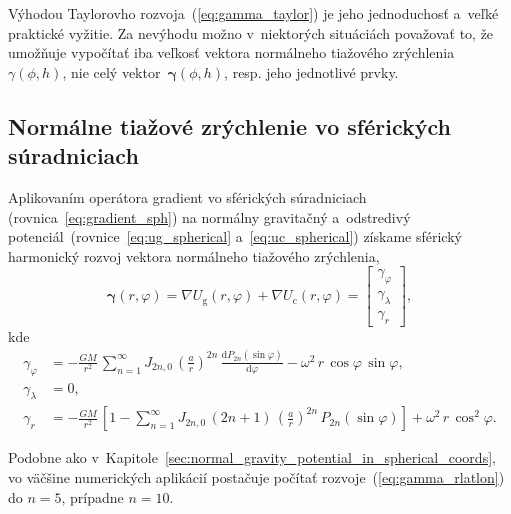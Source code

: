 \documentclass[a4paper,12pt]{book}
\newcommand{\diff}{\mathrm d}
\newcommand{\gidx}{\mathrm g}
\newcommand{\cidx}{\mathrm c}
\begin{document}
Výhodou Taylorovho rozvoja~(\ref{eq:gamma_taylor}) je jeho jednoduchosť a~veľké 
praktické vyžitie.  Za nevýhodu možno v~niektorých situáciách považovať to, že 
umožňuje vypočítať iba veľkosť vektora normálneho tiažového zrýchlenia 
$\gamma(\phi, h)$, nie celý vektor~$\boldsymbol \gamma(\phi, h)$, resp. jeho 
jednotlivé prvky.







\subsection{Normálne tiažové zrýchlenie vo sférických súradniciach}
\label{sec:normal_gravity_in_sph_coords}

Aplikovaním operátora gradient vo sférických súradniciach 
(rovnica~\ref{eq:gradient_sph}) na normálny gravitačný a~odstredivý 
potenciál~(rovnice~\ref{eq:ug_spherical} a~\ref{eq:uc_spherical}) získame 
sférický harmonický rozvoj vektora normálneho tiažového zrýchlenia,
%
\begin{equation}
\boldsymbol \gamma(r, \varphi) = \nabla U_\gidx(r, \varphi) + \nabla U_\cidx(r, 
\varphi) =
%
\begin{bmatrix}
\gamma_\varphi\\
\gamma_\lambda\\
\gamma_r
\end{bmatrix}
%
{,}
\end{equation}
%
kde
%
\begin{equation}
\label{eq:gamma_rlatlon}
\begin{split}
\gamma_\varphi &= -\frac{GM}{r^2} \, \sum_{n = 1}^\infty J_{2n,0} \, \left( 
\frac{a}{r} \right)^{2n} \, \frac{\diff P_{2n}(\sin\varphi)}{\diff \varphi} 
-\omega^2 \, r \, \cos\varphi \, \sin\varphi{,}\\
\gamma_\lambda &= 0{,}\\
\gamma_r &= -\frac{GM}{r^2} \, \left[ 1 - \sum_{n = 1}^{\infty} J_{2n,0} \, (2n 
+ 1) \, \left( \frac{a}{r} \right)^{2n} \, P_{2n}(\sin\varphi) \right] 
+ \omega^2 \, r \, \cos^2\varphi{.}
\end{split}
\end{equation}

Podobne ako v~Kapitole~\ref{sec:normal_gravity_potential_in_spherical_coords}, 
vo väčšine numerických aplikácií postačuje počítať 
rozvoje~(\ref{eq:gamma_rlatlon}) do $n = 5$, prípadne $n = 10$.
\end{document}
